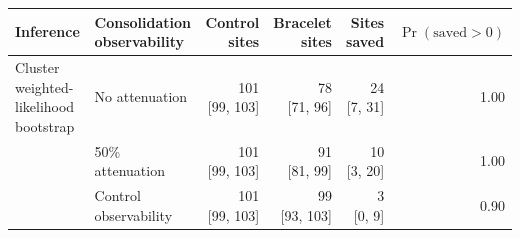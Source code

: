 \begin{tabular}{llrrrr}
\toprule
Inference & Consolidation observability & Control sites & Bracelet sites & Sites saved & $\Pr(\text{saved}>0)$ \\
\midrule
Cluster weighted-likelihood bootstrap & No attenuation & \makecell[c]{101\\{}[99, 103]} & \makecell[c]{78\\{}[71, 96]} & \makecell[c]{24\\{}[7, 31]} & 1.00 \\
 & 50\% attenuation & \makecell[c]{101\\{}[99, 103]} & \makecell[c]{91\\{}[81, 99]} & \makecell[c]{10\\{}[3, 20]} & 1.00 \\
 & Control observability & \makecell[c]{101\\{}[99, 103]} & \makecell[c]{99\\{}[93, 103]} & \makecell[c]{3\\{}[0, 9]} & 0.90 \\
\bottomrule
\end{tabular}
